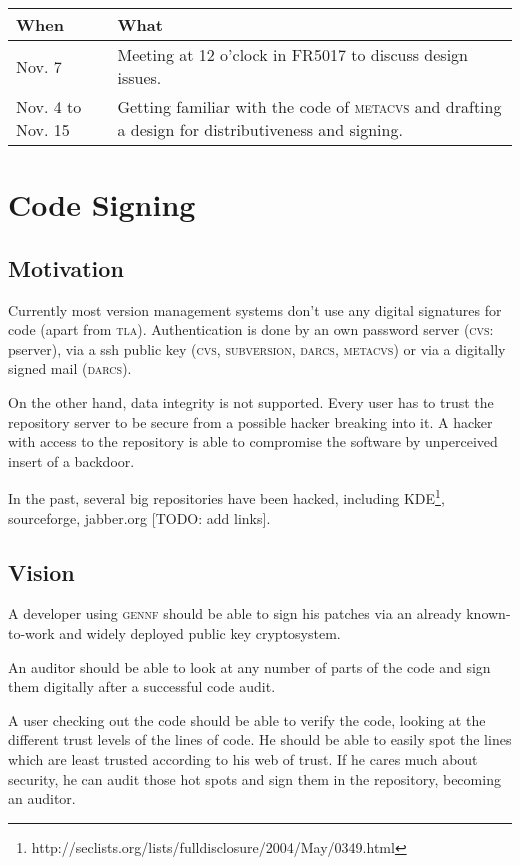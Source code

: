 \documentclass[fleqn, 10pt, a4paper]{article}
\begin{document}
\begin{tabular}{|p{}|p{}|}
\hline
\textmd{When} & \textmd{What} \\
\hline\hline
Nov. 7 &
Meeting at 12 o'clock in FR5017 to discuss design issues. \\
\hline
Nov. 4 to Nov. 15 &
Getting familiar with the code of \textsc{metacvs}
and drafting a design for distributiveness and signing. \\
\hline
\end{tabular}

\section{Code Signing}

\subsection{Motivation}
Currently most version management systems don't use any digital signatures
for code (apart from \textsc{tla}). Authentication is done by an own password
server (\textsc{cvs}: pserver), via a ssh public key (\textsc{cvs},
\textsc{subversion}, \textsc{darcs}, \textsc{metacvs}) or
via a digitally signed mail (\textsc{darcs}).

On the other hand, data integrity is not supported.
Every user has to trust the repository server
to be secure from a possible hacker breaking into it.
A hacker with access to the repository is able to compromise the
software by unperceived insert of a backdoor.

In the past, several big repositories have been hacked, including
KDE\footnote{http://seclists.org/lists/fulldisclosure/2004/May/0349.html},
sourceforge, jabber.org [TODO: add links].


\subsection{Vision}
A developer using \textsc{gennf} should be able to sign his patches via
an already known-to-work and widely deployed public key cryptosystem.

An auditor should be able to look at any number of parts of the code
and sign them digitally after a successful code audit.

A user checking out the code should be able to verify the code, looking
at the different trust levels of the lines of code.
He should be able to easily spot the lines
which are least trusted according to his web of trust. If he cares much
about security, he can audit those hot spots and sign them in the repository,
becoming an auditor.
\end{document}
